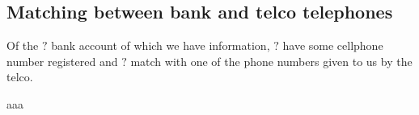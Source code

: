 \subsection{Matching between bank and telco telephones}

Of the \( ? \) bank account of which we have information, \( ? \) have some cellphone number registered and \( ? \) match with one of the phone numbers given to us by the telco.

aaa